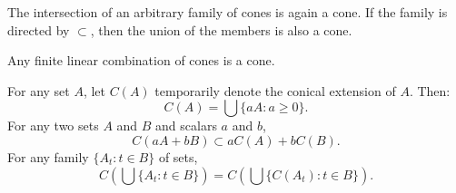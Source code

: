 The intersection of an arbitrary family of cones is again a cone. If the family is directed by $\subset$, then the union of the members is also a cone.

Any finite linear combination of cones is a cone.

For any set $A$, let $C(A)$ temporarily denote the conical extension of $A$. Then:
$$
C(A) = \bigcup \{aA : a \geq 0\}.
$$
For any two sets $A$ and $B$ and scalars $a$ and $b$,
$$
C(aA + bB) \subset a C(A) + b C(B).
$$
For any family $\{A_t : t \in B\}$ of sets,
$$
C\left(\bigcup \{A_t : t \in B\}\right) = C\left(\bigcup \{C(A_t) : t \in B\}\right).
$$
